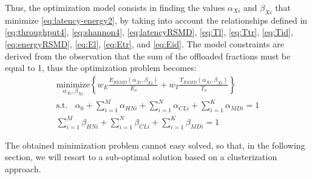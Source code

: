 \documentclass[twoside,openright]{report}
\begin{document}
Thus, the optimization model consists in finding the values $\alpha_\textit{Xi}$ and $\beta_\textit{Xi}$ that minimize \ref{eq:latency-energy2}, by taking into account the relationships defined in \autoref{eq:throughput4}, \ref{eq:shannon4}, \ref{eq:latencyRSMD}, \ref{eq:Tl}, \ref{eq:Ttr}, \ref{eq:Tid}, \ref{eq:energyRSMD}, \ref{eq:El}, \ref{eq:Etr}, and \ref{eq:Eid}. 
The model constraints are derived from the observation that the sum of the offloaded fractions must be equal to 1, thus the optimization problem becomes:
\begin{subequations}
\label{eq:optim-model}
\begin{gather}
\underset{\alpha_\textit{Xi},\beta_\textit{Xi}}{\text{minimize}}\left\{w_E \frac{E_\textit{RSMD}(\alpha_\textit{Xi},\beta_\textit{Xi})}{E_o} + w_T  \frac{T_\textit{RSMD}(\alpha_\textit{Xi},\beta_\textit{Xi})}{T_o}\right\} \\ \text{s.t. } \;\;
\alpha_0 +
\sum_{i=1}^\textit{M} \alpha_\textit{HNi} + \sum_{i=1}^\textit{N} \alpha_\textit{CLi} + \sum_{i=1}^\textit{K} \alpha_\textit{MDi}= 1 \\
 \sum_{i=1}^\textit{M} \beta_\textit{HNi} + \sum_{i=1}^\textit{N} \beta_\textit{CLi} + \sum_{i=1}^\textit{K} \beta_\textit{MDi}= 1
\end{gather}
\end{subequations}

The obtained minimization problem cannot easy solved, so that, in the following section, we will resort to a sub-optimal solution based on a clusterization approach.%

\end{document}
